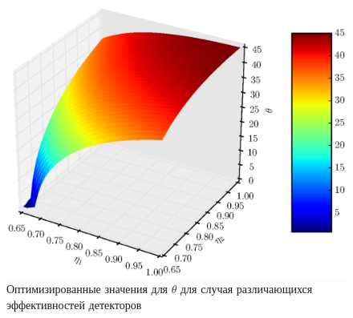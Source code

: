 \documentclass[%
master,         %
subf,           %
href,           %
,times         %
]{disser}
\numberwithin{equation}{section}
\numberwithin{figure}{section}
\begin{document}
\begin{figure}[h]
\includegraphics[scale=0.7]{theta3d.eps}
\caption{Оптимизированные значения для $\theta$ для случая различающихся эффективностей детекторов}
\label{fig:theta_opt_3d}
\end{figure}
\end{document}
